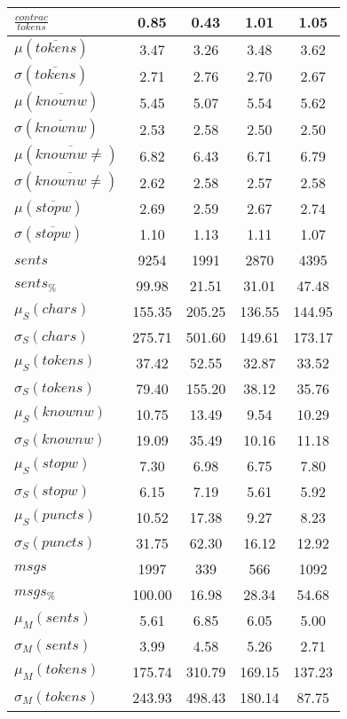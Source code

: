 \begin{table}[h!]
\begin{center}
\begin{tabular}{| l || c | c | c | c |}
$\frac{contrac}{tokens}$ & 0.85  & 0.43  & 1.01  & 1.05 \\\hline\hline
$\mu(\overline{tokens})$ & 3.47  & 3.26  & 3.48  & 3.62 \\
$\sigma(\overline{tokens})$ & 2.71  & 2.76  & 2.70  & 2.67 \\\hline
$\mu(\overline{knownw})$ & 5.45  & 5.07  & 5.54  & 5.62 \\
$\sigma(\overline{knownw})$ & 2.53  & 2.58  & 2.50  & 2.50 \\\hline
$\mu(\overline{knownw \neq})$ & 6.82  & 6.43  & 6.71  & 6.79 \\
$\sigma(\overline{knownw \neq})$ & 2.62  & 2.58  & 2.57  & 2.58 \\\hline
$\mu(\overline{stopw})$ & 2.69  & 2.59  & 2.67  & 2.74 \\
$\sigma(\overline{stopw})$ & 1.10  & 1.13  & 1.11  & 1.07 \\\hline\hline
$sents$ & 9254  & 1991  & 2870  & 4395 \\
$sents_{\%}$ & 99.98  & 21.51  & 31.01  & 47.48 \\\hline
$\mu_S(chars)$ & 155.35  & 205.25  & 136.55  & 144.95 \\
$\sigma_S(chars)$ & 275.71  & 501.60  & 149.61  & 173.17 \\\hline
$\mu_S(tokens)$ & 37.42  & 52.55  & 32.87  & 33.52 \\
$\sigma_S(tokens)$ & 79.40  & 155.20  & 38.12  & 35.76 \\\hline
$\mu_S(knownw)$ & 10.75  & 13.49  & 9.54  & 10.29 \\
$\sigma_S(knownw)$ & 19.09  & 35.49  & 10.16  & 11.18 \\\hline
$\mu_S(stopw)$ & 7.30  & 6.98  & 6.75  & 7.80 \\
$\sigma_S(stopw)$ & 6.15  & 7.19  & 5.61  & 5.92 \\\hline
$\mu_S(puncts)$ & 10.52  & 17.38  & 9.27  & 8.23 \\
$\sigma_S(puncts)$ & 31.75  & 62.30  & 16.12  & 12.92 \\\hline\hline
$msgs$ & 1997  & 339  & 566  & 1092 \\
$msgs_{\%}$ & 100.00  & 16.98  & 28.34  & 54.68 \\\hline
$\mu_M(sents)$ & 5.61  & 6.85  & 6.05  & 5.00 \\
$\sigma_M(sents)$ & 3.99  & 4.58  & 5.26  & 2.71 \\\hline
$\mu_M(tokens)$ & 175.74  & 310.79  & 169.15  & 137.23 \\
$\sigma_M(tokens)$ & 243.93  & 498.43  & 180.14  & 87.75 \\\hline

\end{tabular}
\end{center}
\end{table}
